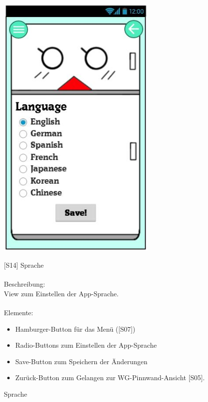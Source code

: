 \documentclass[a4paper]{scrreprt}
\begin{document}
    	\begin{figure}[h!]
    		\begin{minipage}[t]{0.37\linewidth}
    			\flushright
    			\centering
    			\vspace{1mm}
    			\includegraphics[width=0.7\textwidth]{fridget_language.JPG}
    			\caption{Sprache}
    			\label{fig:figure1}
    			\vspace{15mm}
    		\end{minipage}
    		\hspace{0.5cm}
    		\begin{minipage}[t]{0.6\linewidth}
    			\flushleft
    			{[}S14{]} Sprache \\
    			\hfill
    			\\
    			Beschreibung: \\
    			View zum Einstellen der App-Sprache.\\
    			
    			\hfill
    			\\Elemente:\\
    			\begin{itemize}
    				\renewcommand\labelitemi{--}
    				\item Hamburger-Button für das Menü ({[}S07{]})
    				\item Radio-Buttons zum Einstellen der App-Sprache
    				\item Save-Button zum Speichern der Änderungen
    				\item Zurück-Button zum Gelangen zur
    				WG-Pinnwand-Ansicht {[}S05{]}.
    				

\end{itemize}
\end{minipage}
\end{figure}
\end{document}

